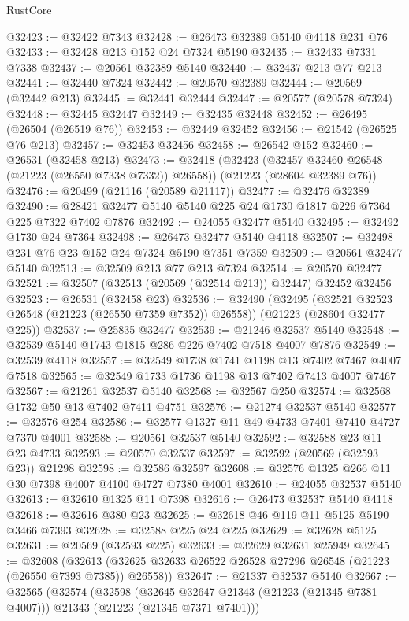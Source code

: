 \begin{lexlean}{RustCore}
\begin{coremodule}
@32423 := @32422 @7343
@32428 := @26473 @32389 @5140 @4118 @231 @76
@32433 := @32428 @213 @152 @24 @7324 @5190
@32435 := @32433 @7331 @7338
@32437 := @20561 @32389 @5140
@32440 := @32437 @213 @77 @213
@32441 := @32440 @7324
@32442 := @20570 @32389
@32444 := @20569 (@32442 @213)
@32445 := @32441 @32444
@32447 := @20577 (@20578 @7324)
@32448 := @32445 @32447
@32449 := @32435 @32448
@32452 := @26495 (@26504 (@26519 @76))
@32453 := @32449 @32452
@32456 := @21542 (@26525 @76 @213)
@32457 := @32453 @32456
@32458 := @26542 @152
@32460 := @26531 (@32458 @213)
@32473 := @32418
    (@32423 (@32457 @32460 @26548 (@21223 (@26550 @7338 @7332)) @26558))
    (@21223 (@28604 @32389 @76))
@32476 := @20499 (@21116 (@20589 @21117))
@32477 := @32476 @32389
@32490 := @28421 @32477 @5140 @5140 @225 @24 @1730 @1817 @226 @7364 @225 @7322 @7402 @7876
@32492 := @24055 @32477 @5140
@32495 := @32492 @1730 @24 @7364
@32498 := @26473 @32477 @5140 @4118
@32507 := @32498 @231 @76 @23 @152 @24 @7324 @5190 @7351 @7359
@32509 := @20561 @32477 @5140
@32513 := @32509 @213 @77 @213 @7324
@32514 := @20570 @32477
@32521 := @32507 (@32513 (@20569 (@32514 @213)) @32447) @32452 @32456
@32523 := @26531 (@32458 @23)
@32536 := @32490
    (@32495 (@32521 @32523 @26548 (@21223 (@26550 @7359 @7352)) @26558))
    (@21223 (@28604 @32477 @225))
@32537 := @25835 @32477
@32539 := @21246 @32537 @5140
@32548 := @32539 @5140 @1743 @1815 @286 @226 @7402 @7518 @4007 @7876
@32549 := @32539 @4118
@32557 := @32549 @1738 @1741 @1198 @13 @7402 @7467 @4007 @7518
@32565 := @32549 @1733 @1736 @1198 @13 @7402 @7413 @4007 @7467
@32567 := @21261 @32537 @5140
@32568 := @32567 @250
@32574 := @32568 @1732 @50 @13 @7402 @7411 @4751
@32576 := @21274 @32537 @5140
@32577 := @32576 @254
@32586 := @32577 @1327 @11 @49 @4733 @7401 @7410 @4727 @7370 @4001
@32588 := @20561 @32537 @5140
@32592 := @32588 @23 @11 @23 @4733
@32593 := @20570 @32537
@32597 := @32592 (@20569 (@32593 @23)) @21298
@32598 := @32586 @32597
@32608 := @32576 @1325 @266 @11 @30 @7398 @4007 @4100 @4727 @7380 @4001
@32610 := @24055 @32537 @5140
@32613 := @32610 @1325 @11 @7398
@32616 := @26473 @32537 @5140 @4118
@32618 := @32616 @380 @23
@32625 := @32618 @46 @119 @11 @5125 @5190 @3466 @7393
@32628 := @32588 @225 @24 @225
@32629 := @32628 @5125
@32631 := @20569 (@32593 @225)
@32633 := @32629 @32631 @25949
@32645 := @32608
    (@32613 (@32625 @32633 @26522 @26528 @27296 @26548 (@21223 (@26550 @7393 @7385)) @26558))
@32647 := @21337 @32537 @5140
@32667 := @32565
    (@32574
      (@32598
        (@32645 @32647 @21343 (@21223 (@21345 @7381 @4007)))
        @21343
        (@21223 (@21345 @7371 @7401)))

\end{coremodule}
\end{lexlean}
